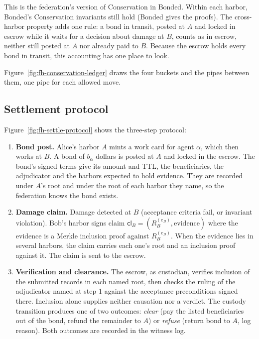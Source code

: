 \documentclass[11pt,a4paper]{article}
\theoremstyle{definition}
\theoremstyle{remark}
\begin{document}
This is the federation's version of Conservation in Bonded. Within each harbor, Bonded's Conservation invariants still hold (Bonded gives the proofs). The cross-harbor property adds one rule: a bond in transit, posted at $A$ and locked in escrow while it waits for a decision about damage at $B$, counts as in escrow, neither still posted at $A$ nor already paid to $B$. Because the escrow holds every bond in transit, this accounting has one place to look.

Figure~\ref{fig:fh-conservation-ledger} draws the four buckets and the pipes between them, one pipe for each allowed move.





\subsection{Settlement protocol}\label{sec:fh-settle-proto}

Figure~\ref{fig:fh-settle-protocol} shows the three-step protocol:



\begin{enumerate}[nosep]
\item \textbf{Bond post.} Alice's harbor $A$ mints a work card for agent $\alpha$, which then works at $B$. A bond of $b_\alpha$ dollars is posted at $A$ and locked in the escrow. The bond's signed terms give its amount and TTL, the beneficiaries, the adjudicator and the harbors expected to hold evidence. They are recorded under $A$'s root and under the root of each harbor they name, so the federation knows the bond exists.
\item \textbf{Damage claim.} Damage detected at $B$ (acceptance criteria fail, or invariant violation). Bob's harbor signs claim $\mathsf{cl}_B = (R_B^{(e_B)}, \mathrm{evidence})$ where the evidence is a Merkle inclusion proof against $R_B^{(e_B)}$. When the evidence lies in several harbors, the claim carries each one's root and an inclusion proof against it. The claim is sent to the escrow.
\item \textbf{Verification and clearance.} The escrow, as custodian, verifies inclusion of the submitted records in each named root, then
checks the ruling of the adjudicator named at step 1 against the
acceptance preconditions signed there. Inclusion alone supplies neither
causation nor a verdict. The custody transition produces one of two outcomes: \emph{clear} (pay the listed beneficiaries out of the bond, refund the remainder to $A$) or \emph{refuse} (return bond to $A$, log reason). Both outcomes are recorded in the witness log.
\end{enumerate}
\end{document}
